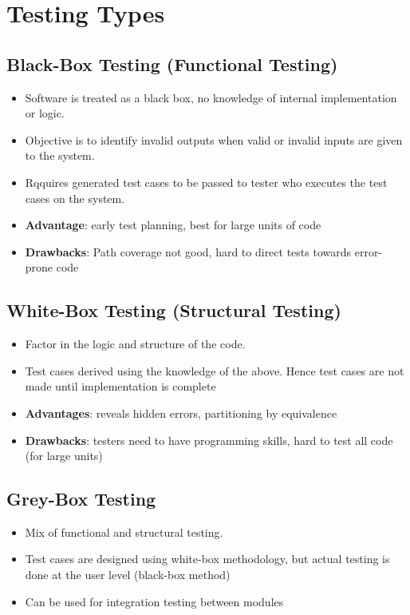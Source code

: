 \documentclass{article}
\begin{document}
\section{Testing Types}
\subsection{Black-Box Testing (Functional Testing)}
\begin{itemize}
    \item Software is treated as a black box, no knowledge of internal implementation or logic. 
    
    \item Objective is to identify invalid outputs when valid or invalid inputs are given to the system. 
    
    \item Rqquires generated test cases to be passed to tester who executes the test cases on the system. 
    
    \item \textbf{Advantage}: early test planning, best for large units of code
    
    \item \textbf{Drawbacks}: Path coverage not good, hard to direct tests towards error-prone code
\end{itemize}

\subsection{White-Box Testing (Structural Testing)}
\begin{itemize}
    \item Factor in the logic and structure of the code. 
    
    \item Test cases derived using the knowledge of the above. Hence test cases are not made until implementation is complete
    
    \item \textbf{Advantages}: reveals hidden errors, partitioning by equivalence
    
    \item \textbf{Drawbacks}: testers need to have programming skills, hard to test all code (for large units)
\end{itemize}

\subsection{Grey-Box Testing}
\begin{itemize}
    \item Mix of functional and structural testing. 
    
    \item Test cases are designed using white-box methodology, but actual testing is done at the user level (black-box method)
    
    \item Can be used for integration testing between modules
\end{itemize}
\end{document}
